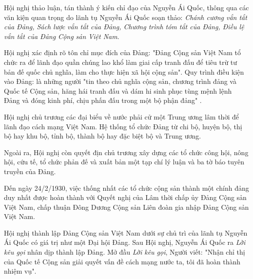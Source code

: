 Hội nghị thảo luận, tán thành ý kiến chỉ đạo của Nguyễn Ái Quốc, thông qua các văn kiện quan trọng do lãnh tụ Nguyễn Ái Quốc soạn thảo: \textit{Chánh cương vắn tắt của Đảng, Sách lược vắn tắt của Đảng, Chương trình tóm tắt của Đảng, Điều lệ vắn tắt của Đảng Cộng sản Việt Nam}.

Hội nghị xác định rõ tôn chỉ mục đích của Đảng: "Đảng Cộng sản Việt Nam tổ chức ra để lãnh đạo quần chúng lao khổ làm giai cấp tranh đấu để tiêu trừ tư bản đế quốc chủ nghĩa, làm cho thực hiện xã hội cộng sản". Quy trình điều kiện vào Đảng: là những người "tin theo chủ nghĩa cộng sản, chương trình đảng và Quốc tế Cộng sản, hăng hái tranh đấu và dám hi sinh phục tùng mệnh lệnh Đảng và đóng kinh phí, chịu phấn đấu trong một bộ phận đảng" .

Hội nghị chủ trương các đại biểu về nước phải cử một Trung ương lâm thời để lãnh đạo cách mạng Việt Nam. Hệ thống tổ chức Đảng từ chi bộ, huyện bộ, thị bộ hay khu bộ, tỉnh bộ, thành bộ hay đặc biệt bộ và Trung ương.

Ngoài ra, Hội nghị còn quyết địn chủ trương xây dựng các tổ chức công hội, nông hội, cứu tế, tổ chức phản đế và xuất bản một tạp chí lý luận và ba tờ báo tuyên truyền của Đảng.

Đến ngày 24/2/1930, việc thống nhất các tổ chức cộng sản thành một chính đảng duy nhất được hoàn thành với Quyết nghị của Lâm thời chấp ủy Đảng Cộng sản Việt Nam, chấp thuận Đông Dương Cộng sản Liên đoàn gia nhập Đảng Cộng sản Việt Nam.

Hội nghị thành lập Đảng Cộng sản Việt Nam dưới sự chủ trì của lãnh tụ Nguyễn Ái Quốc có giá trị như một Đại hội Đảng. Sau Hội nghị, Nguyễn Ái Quốc ra \textit{Lời kêu gọi} nhân dịp thành lập Đảng. Mở đầu \textit{Lời kêu gọi}, Người viết: "Nhận chỉ thị của Quốc tế Cộng sản giải quyết vấn đề cách mạng nước ta, tôi đã hoàn thành nhiệm vụ".
